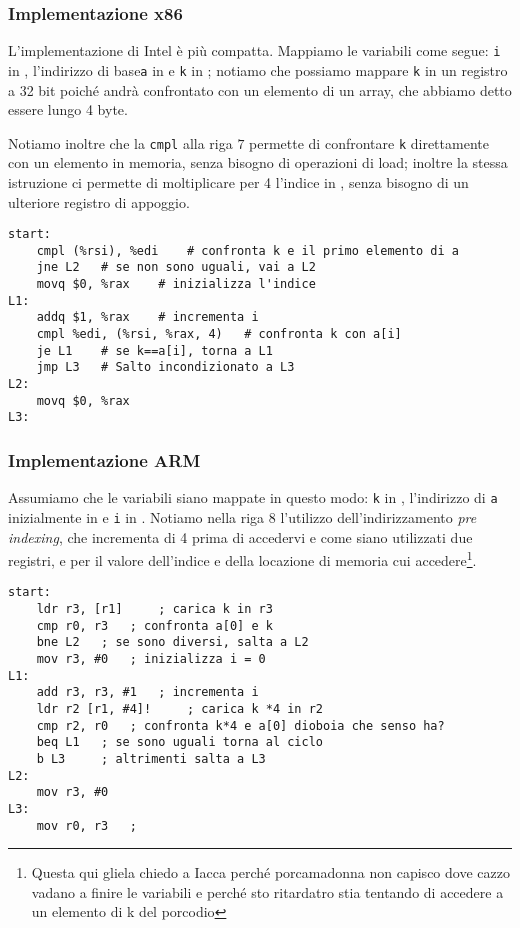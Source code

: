 \documentclass[class=book, crop=false, oneside]{standalone}
\begin{document}
\subsubsection{Implementazione x86}
L'implementazione di Intel è più compatta. Mappiamo le variabili come segue: \texttt{i} in , l'indirizzo di base\texttt{a} in  e \texttt{k} in ; notiamo che possiamo mappare \texttt{k} in un registro a 32 bit poiché andrà confrontato con un elemento di un array, che abbiamo detto essere lungo 4 byte.

Notiamo inoltre che la \texttt{cmpl} alla riga \(7\) permette di confrontare \texttt{k} direttamente con un elemento in memoria, senza bisogno di operazioni di load; inoltre la stessa istruzione ci permette di moltiplicare per 4 l'indice in , senza bisogno di un ulteriore registro di appoggio.
\begin{verbatim}
start:
	cmpl (%rsi), %edi	 # confronta k e il primo elemento di a
	jne L2	 # se non sono uguali, vai a L2
	movq $0, %rax	 # inizializza l'indice
L1:
	addq $1, %rax	 # incrementa i
	cmpl %edi, (%rsi, %rax, 4)	 # confronta k con a[i]
	je L1	 # se k==a[i], torna a L1
	jmp L3	 # Salto incondizionato a L3
L2:
	movq $0, %rax
L3:
\end{verbatim}

\subsubsection{Implementazione ARM}
Assumiamo che le variabili siano mappate in questo modo: \texttt{k} in , l'indirizzo di \texttt{a} inizialmente in  e \texttt{i} in . Notiamo nella riga 8 l'utilizzo dell'indirizzamento \emph{pre indexing}, che incrementa  di 4 prima di accedervi e come siano utilizzati due registri,  e  per il valore dell'indice e della locazione di memoria cui accedere\footnote{Questa qui gliela chiedo a Iacca perché porcamadonna non capisco dove cazzo vadano a finire le variabili e perché sto ritardatro stia tentando di accedere a un elemento di k del porcodio}.
\begin{verbatim}
start:
	ldr r3, [r1]	 ; carica k in r3
	cmp r0, r3	 ; confronta a[0] e k
	bne L2	 ; se sono diversi, salta a L2
	mov r3, #0	 ; inizializza i = 0
L1:
	add r3, r3, #1	 ; incrementa i
	ldr r2 [r1, #4]!	 ; carica k *4 in r2
	cmp r2, r0	 ; confronta k*4 e a[0] dioboia che senso ha?
	beq L1	 ; se sono uguali torna al ciclo
	b L3	 ; altrimenti salta a L3
L2:
	mov r3, #0
L3:
	mov r0, r3	 ;
\end{verbatim}
\end{document}
